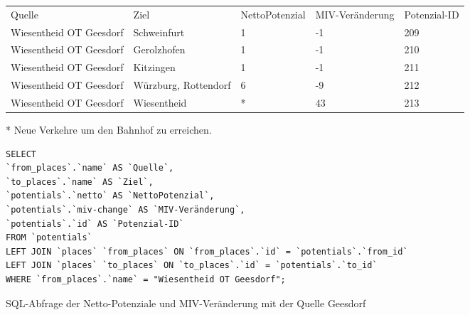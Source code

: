 \begin{tabular}{ l  l  l  l  l }
Quelle & Ziel & NettoPotenzial & MIV-Veränderung & Potenzial-ID\\ 
Wiesentheid OT Geesdorf & Schweinfurt & 1 & -1 & 209\\ 
Wiesentheid OT Geesdorf & Gerolzhofen & 1 & -1 & 210\\ 
Wiesentheid OT Geesdorf & Kitzingen & 1 & -1 & 211\\ 
Wiesentheid OT Geesdorf & Würzburg, Rottendorf & 6 & -9 & 212\\ 
Wiesentheid OT Geesdorf & Wiesentheid & * & 43 & 213\\ 
\end{tabular}    
\newline
\newline
* Neue Verkehre um den Bahnhof zu erreichen.
\newline
\begin{listing}[htbp]
\begin{verbatim}
SELECT
`from_places`.`name` AS `Quelle`, 
`to_places`.`name` AS `Ziel`, 
`potentials`.`netto` AS `NettoPotenzial`, 
`potentials`.`miv-change` AS `MIV-Veränderung`, 
`potentials`.`id` AS `Potenzial-ID`
FROM `potentials`
LEFT JOIN `places` `from_places` ON `from_places`.`id` = `potentials`.`from_id`
LEFT JOIN `places` `to_places` ON `to_places`.`id` = `potentials`.`to_id`
WHERE `from_places`.`name` = "Wiesentheid OT Geesdorf";
\end{verbatim}
\caption{SQL-Abfrage der Netto-Potenziale und MIV-Veränderung mit der Quelle Geesdorf}\label{lst-fz-geesdorf}
\end{listing}
